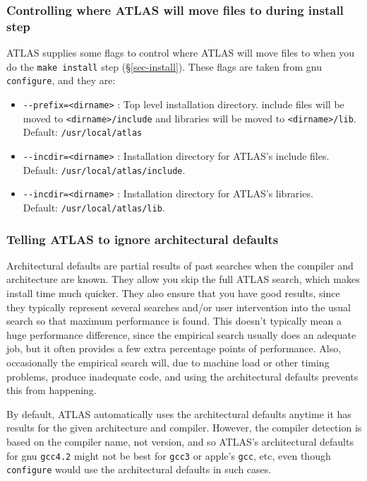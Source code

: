 \documentclass[11pt]{article}
\begin{document}
\subsubsection{Controlling where ATLAS will move files to during install step}
ATLAS supplies some flags to control where ATLAS will move files to when
you do the {\tt make install} step (\S\ref{sec-install}).  These flags
are taken from gnu {\tt configure}, and they are:
\begin{itemize}
\item \verb|--prefix=<dirname>| : Top level installation directory.
      include files will be moved to \verb|<dirname>/include| and
      libraries will be moved to \verb|<dirname>/lib|.
      Default: {\tt /usr/local/atlas}
\item \verb|--incdir=<dirname>| : Installation directory for ATLAS's
      include files.  Default: {\tt /usr/local/atlas/include}.
\item \verb|--incdir=<dirname>| : Installation directory for ATLAS's
      libraries. \\ Default: {\tt /usr/local/atlas/lib}.
\end{itemize}

\subsubsection{Telling ATLAS to ignore architectural defaults}
\label{sec-nodefaults}
Architectural defaults are partial results of past searches when
the compiler and architecture are known.  They allow you skip the
full ATLAS search, which makes install time much quicker.  They also
ensure that you have good results, since they typically represent
several searches and/or user intervention into the usual search so
that maximum performance is found.  This doesn't typically mean a huge
performance difference, since the empirical search usually does an adequate
job, but it often provides a few extra percentage points of performance.  Also,
occasionally the empirical search will, due to machine load or other timing
problems, produce inadequate code, and using the architectural defaults
prevents this from happening.

By default, ATLAS automatically uses the architectural defaults anytime
it has results for the given architecture and compiler.  However, the
compiler detection is based on the compiler name, not version, and so
ATLAS's architectural defaults for gnu {\tt gcc4.2} might not be best
for {\tt gcc3} or apple's {\tt gcc}, etc, even though {\tt configure} would
use the architectural defaults in such cases.
\end{document}

